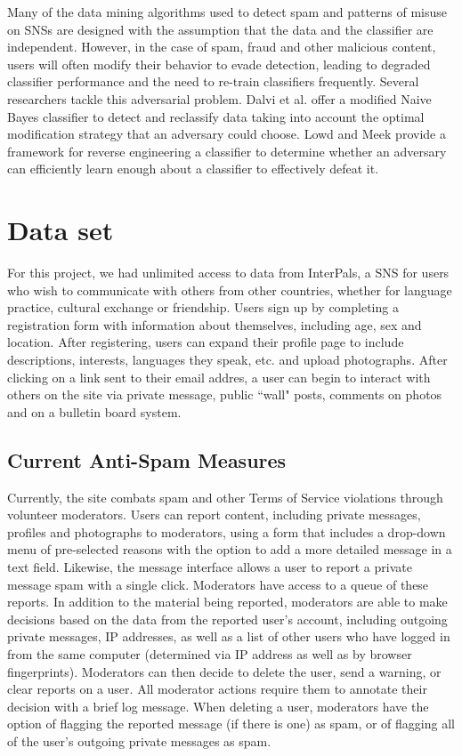 \documentclass[preprint]{acm_proc_article-sp}
\begin{document}
Many of the data mining algorithms used to detect spam and patterns of misuse on SNSs are designed with the assumption that the data and the classifier are independent. However, in the case of spam, fraud and other malicious content, users will often modify their behavior to evade detection, leading to degraded classifier performance and the need to re-train classifiers frequently. Several researchers tackle this adversarial problem. Dalvi et al. \cite{dalvi} offer a modified Naive Bayes classifier to detect and reclassify data taking into account the optimal modification strategy that an adversary could choose. Lowd and Meek \cite{lowd} provide a framework for reverse engineering a classifier to determine whether an adversary can efficiently learn enough about a classifier to effectively defeat it.


\section{Data set}

For this project, we had unlimited access to data from InterPals, a SNS for users who wish to communicate with others from other countries, whether for language practice, cultural exchange or friendship. Users sign up by completing a registration form with information about themselves, including age, sex and location. After registering, users can expand their profile page to include descriptions, interests, languages they speak, etc. and upload photographs. After clicking on a link sent to their email addres, a user can begin to interact with others on the site via private message, public ``wall" posts, comments on photos and on a bulletin board system.

\subsection{Current Anti-Spam Measures}

Currently, the site combats spam and other Terms of Service violations through volunteer moderators. Users can report content, including private messages, profiles and photographs to moderators, using a form that includes a drop-down menu of pre-selected reasons with the option to add a more detailed message in a text field. Likewise, the message interface allows a user to report a private message spam with a single click. Moderators have access to a queue of these reports. In addition to the material being reported, moderators are able to make decisions based on the data from the reported user's account, including outgoing private messages, IP addresses, as well as a list of other users who have logged in from the same computer (determined via IP address as well as by browser fingerprints). Moderators can then decide to delete the user, send a warning, or clear reports on a user. All moderator actions require them to annotate their decision with a brief log message. When deleting a user, moderators have the option of flagging the reported message (if there is one) as spam, or of flagging all of the user's outgoing private messages as spam.
\end{document}
